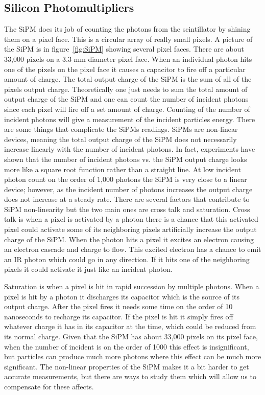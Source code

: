 \subsection{Silicon Photomultipliers}
The SiPM does its job of counting the photons from the scintillator by shining them on a pixel face. This is a circular array of really small pixels. A picture of the SiPM is in figure~\ref{fig:SiPM} showing several pixel faces. There are about 33,000 pixels on a 3.3 mm diameter pixel face. When an individual photon hits one of the pixels on the pixel face it causes a capacitor to fire off a particular amount of charge. The total output charge of the SiPM is the sum of all of the pixels output charge. Theoretically one just needs to sum the total amount of output charge of the SiPM and one can count the number of incident photons since each pixel will fire off a set amount of charge. Counting of the number of incident photons will give a measurement of the incident particles energy. There are some things that complicate the SiPMs readings. SiPMs are non-linear devices, meaning the total output charge of the SiPM does not necessarily increase linearly with the number of incident photons. In fact, experiments have shown that the number of incident photons vs. the SiPM output charge looks more like a square root function rather than a straight line. At low incident photon count on the order of 1,000 photons the SiPM is very close to a linear device; however, as the incident number of photons increases the output charge does not increase at a steady rate. There are several factors that contribute to SiPM non-linearity but the two main ones are cross talk and saturation. Cross talk is when a pixel is activated by a photon there is a chance that this activated pixel could activate some of its neighboring pixels artificially increase the output charge of the SiPM. When the photon hits a pixel it excites an electron causing an electron cascade and charge to flow. This excited electron has a chance to emit an IR photon which could go in any direction. If it hits one of the neighboring pixels it could activate it just like an incident photon. 

Saturation is when a pixel is hit in rapid succession by multiple photons. When a pixel is hit by a photon it discharges its capacitor which is the source of its output charge. After the pixel fires it needs some time on the order of 10 nanoseconds to recharge its capacitor. If the pixel is hit it simply fires off whatever charge it has in its capacitor at the time, which could be reduced from its normal charge. Given that the SiPM has about 33,000 pixels on its pixel face, when the number of incident is on the order of 1000 this effect is insignificant, but particles can produce much more photons where this effect can be much more significant. The non-linear properties of the SiPM makes it a bit harder to get accurate measurements, but there are ways to study them which will allow us to compensate for these affects.

